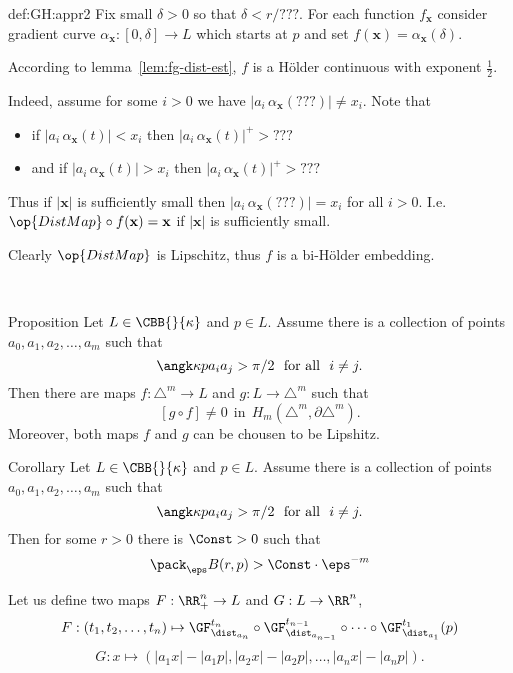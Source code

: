 {\begin{subthm}{def:GH:appr2}
Fix small $\delta>0$ so that $\delta<r/???$.
For each function $f_{\mathbf x}$ consider gradient curve $\alpha_{\mathbf x}:[0,\delta]\to L$ which starts at $p$ and set $f(\mathbf x)=\alpha_{\mathbf x}(\delta)$.

According to lemma~\ref{lem:fg-dist-est}, $f$ is a H\"older continuous with exponent $\tfrac12$. 

Indeed, assume for some $i>0$ we have $|{a_i}\,\alpha_{\mathbf x}(???)|\not=x_i$.
Note that 
\begin{itemize}
\item if 
$|{a_i}\,\alpha_{\mathbf x}(t)|<x_i$ then $|{a_i}\,\alpha_{\mathbf x}(t)|^+>???$
\item  and if $|{a_i}\,\alpha_{\mathbf x}(t)|>x_i$ then $|{a_i}\,\alpha_{\mathbf x}(t)|^+>???$
\end{itemize}
Thus if $|\mathbf x|$ is sufficiently small then $|{a_i}\,\alpha_{\mathbf x}(???)|=x_i$ for all $i>0$.
I.e. $\op{DistMap}\circ f(\mathbf x)=\mathbf x$ if $|\mathbf x|$ is sufficiently small.

Clearly $\op{DistMap}$ is Lipschitz, thus $f$ is a bi-H\"older embedding.

\ 















\begin{thm}{Proposition}\label{top>=m}
Let $L\in\CBB{}{\kappa}$ and $p\in L$.
Assume there is a collection of points $a_0,a_1,a_2,\dots,a_m$ such that 
$$\angk\kappa p{a_i}{a_j}>\pi/2\ \ \text{for all}\ \  i\not=j.$$ 
Then there are maps $f:\triangle^m\to L$ and $g:L\to \triangle^m$ such that 
$$[g\circ f]\not=0\ \ \text{in}\ \  H_m(\triangle^m,\partial\triangle^m).$$
Moreover, both maps $f$ and $g$ can be chousen to be Lipshitz.
\end{thm}

\begin{thm}{Corollary}\label{pack>=m}
Let $L\in\CBB{}{\kappa}$ and $p\in L$.
Assume there is a collection of points $a_0,a_1,a_2,\dots,a_m$ such that 
$$\angk\kappa p{a_i}{a_j}>\pi/2\ \ \text{for all}\ \  i\not=j.$$ 
Then for some $r>0$ there is $\Const>0$ such that 
$$\pack_\eps B(r,p)>\Const\cdot\eps^{-m}$$
\end{thm}


 Let us define two maps $F:\RR^n_+\to L$ and $G:L\to \RR^n$,
$$F:(t_1,t_2,\dots,t_n)
\mapsto 
\GF_{\dist_{a_n}}^{t_n}
\circ
\GF_{\dist_{a_{n-1}}}^{t_{n-1}}
\circ\dots\circ
\GF_{\dist_{a_1}}^{t_1}(p)$$
$$G:x
\mapsto
(|a_1x|-|a_1p|,
|a_2x|-|a_2p|,\dots,
|a_nx|-|a_np|).$$


\end{subthm}}
